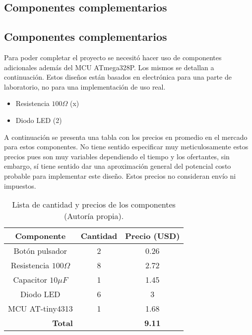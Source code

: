 \subsection{Componentes complementarios}
\subsection{Componentes complementarios}
Para poder completar el proyecto se necesitó hacer uso de componentes adicionales además del MCU ATmega328P. Los mismos se detallan a continuación. Estos diseños están basados en electrónica para una parte de laboratorio, no para una implementación de uso real. 

\begin{itemize}
    \item Resistencia $100\Omega$ (x)
    \item Diodo LED (2)
\end{itemize}

A continuación se presenta una tabla con los precios en promedio en el mercado para estos componentes. No tiene sentido especificar muy meticulosamente estos precios pues son muy variables dependiendo el tiempo y los ofertantes, sin embargo, sí tiene sentido dar una aproximación general del potencial costo probable para implementar este diseño. Estos precios no consideran envío ni impuestos.


\begin{table}[H]
\centering
\begin{tabular}{|cc|c|}
\hline
\multicolumn{1}{|c|}{\textbf{Componente}} & \textbf{Cantidad} & \textbf{Precio (USD)} \\ \hline
\multicolumn{1}{|c|}{Botón pulsador}        & 2                 & 0.26             \\ \hline
\multicolumn{1}{|c|}{Resistencia $100\Omega$}        & 8                 & 2.72              \\ \hline
\multicolumn{1}{|c|}{Capacitor $10\mu F$}        & 1                 & 1.45              \\ \hline
\multicolumn{1}{|c|}{Diodo LED}        & 6                 & 3              \\ \hline
\multicolumn{1}{|c|}{MCU AT-tiny4313}        & 1                 & 1.68              \\ \hline
\multicolumn{2}{|c|}{\textbf{Total}}                          & \textbf{9.11}    \\ \hline
\end{tabular}
\label{componentes}
\caption{Lista de cantidad y precios de los componentes (Autoría propia).}
\end{table}